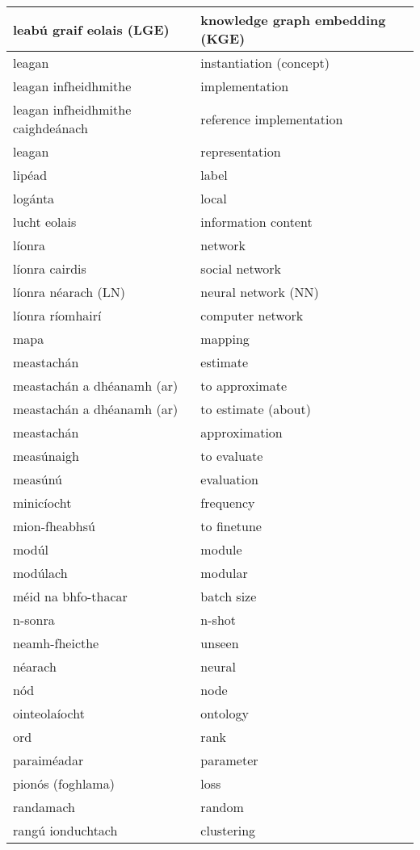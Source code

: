 \documentclass{article}
\begin{document}
\begin{longtable}{|l|l|}
		leabú graif eolais (LGE)&knowledge graph embedding (KGE)\\ \hline 
		leagan&instantiation (concept)\\ \hline 
		leagan infheidhmithe&implementation\\ \hline 
		leagan infheidhmithe caighdeánach&reference implementation\\ \hline 
		leagan&representation\\ \hline 
		lipéad&label\\ \hline 
		logánta&local\\ \hline 
		lucht eolais&information content\\ \hline 
		líonra&network\\ \hline 
		líonra cairdis&social network\\ \hline 
		líonra néarach (LN)&neural network (NN)\\ \hline 
		líonra ríomhairí&computer network\\ \hline 
		mapa&mapping\\ \hline 
		meastachán&estimate\\ \hline 
		meastachán a dhéanamh (ar)&to approximate\\ \hline 
		meastachán a dhéanamh (ar)&to estimate (about)\\ \hline 
		meastachán&approximation\\ \hline 
		measúnaigh&to evaluate\\ \hline 
		measúnú&evaluation\\ \hline 
		minicíocht&frequency\\ \hline 
		mion-fheabhsú&to finetune\\ \hline 
		modúl&module\\ \hline 
		modúlach&modular\\ \hline 
		méid na bhfo-thacar&batch size\\ \hline 
		n-sonra&n-shot\\ \hline 
		neamh-fheicthe&unseen\\ \hline 
		néarach&neural\\ \hline 
		nód&node\\ \hline 
		ointeolaíocht&ontology\\ \hline 
		ord&rank\\ \hline 
		paraiméadar&parameter\\ \hline 
		pionós (foghlama)&loss\\ \hline 
		randamach&random\\ \hline 
		rangú ionduchtach&clustering\\ \hline 

\end{longtable}
\end{document}
